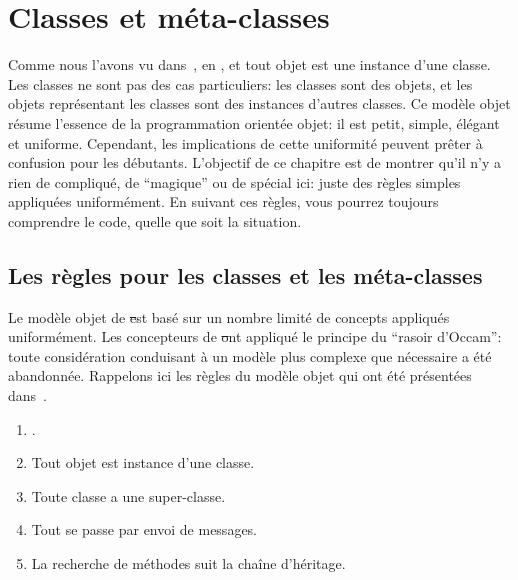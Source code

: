 \documentclass[a4paper,10pt,twoside]{book}
\begin{document}
	\renewcommand{\nnbb}[2]{} %
	\sloppy
\fi
\chapter{Classes et méta-classes}


Comme nous l'avons vu dans~, en \st \mantra, et tout objet est une instance d'une classe.
Les classes ne sont pas des cas particuliers:
les classes sont des objets, et les objets représentant les classes sont des instances d'autres classes.
Ce modèle objet résume l'essence de la programmation orientée objet: il est petit, simple, élégant et uniforme.
Cependant, les implications de cette uniformité peuvent prêter à confusion pour les débutants.
L'objectif de ce chapitre est de montrer qu'il n'y a rien de compliqué, de ``magique'' ou de spécial ici: juste des règles simples appliquées uniformément. 
En suivant ces règles, vous pourrez toujours comprendre le code, quelle que soit la situation.

\section{Les règles pour les classes et les méta-classes}

Le modèle objet de \st est basé sur un nombre limité de concepts appliqués uniformément.
Les concepteurs de \st ont appliqué le principe du ``rasoir d'Occam'': toute considération conduisant à un modèle plus complexe que nécessaire a été abandonnée.
Rappelons ici les règles du modèle objet qui ont été présentées dans~.

\begin{enumerate}[label={\textbf{Règle \arabic{*}}.}, ref={la règle~\arabic{*}}, leftmargin=*, widest=10]
\item{} %
	\Mantra.

\item{} %
	Tout objet est instance d'une classe.

\item{} %
	Toute classe a une super-classe.

\item{} %
	Tout se passe par envoi de messages. 
\item{} %
	La recherche de méthodes suit la chaîne d'héritage.
\end{enumerate}
\end{document}
